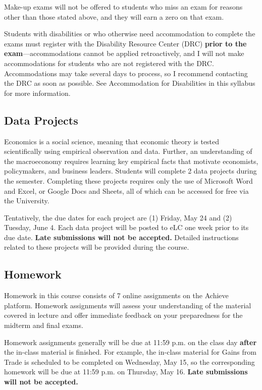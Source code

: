 Make-up exams will not be offered to students who miss an exam for reasons other than those stated above, and they will earn a zero on that exam.

Students with disabilities or who otherwise need accommodation to complete the exams must register with the Disability Resource Center (DRC) \textbf{prior to the exam}---accommodations cannot be applied retroactively, and I will not make accommodations for students who are not registered with the DRC. Accommodations may take several days to process, so I recommend contacting the DRC as soon as possible. See Accommodation for Disabilities in this syllabus for more information.

\subsection*{Data Projects}
Economics is a social science, meaning that economic theory is tested scientifically using empirical observation and data. Further, an understanding of the macroeconomy requires learning key empirical facts that motivate economists, policymakers, and business leaders. Students will complete 2 data projects during the semester. Completing these projects requires only the use of Microsoft Word and Excel, or Google Docs and Sheets, all of which can be accessed for free via the University.

Tentatively, the due dates for each project are (1) Friday, May 24 and (2) Tuesday, June 4. Each data project will be posted to eLC one week prior to its due date. \textbf{Late submissions will not be accepted.} Detailed instructions related to these projects will be provided during the course.

\subsection*{Homework}
Homework in this course consists of 7 online assignments on the Achieve platform. Homework assignments will assess your understanding of the material covered in lecture and offer immediate feedback on your preparedness for the midterm and final exams.

Homework assignments generally will be due at 11:59 p.m. on the class day \textbf{after} the in-class material is finished. For example, the in-class material for Gains from Trade is scheduled to be completed on Wednesday, May 15, so the corresponding homework will be due at 11:59 p.m. on Thursday, May 16. \textbf{Late submissions will not be accepted.}

